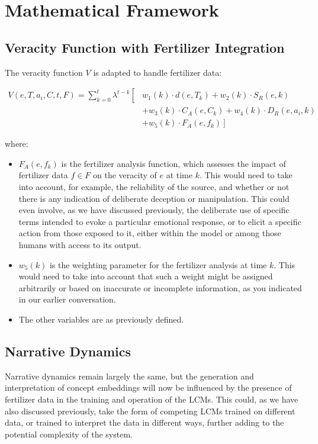 \documentclass[12pt, a4paper]{article}
\begin{document}
\section{Mathematical Framework}

\subsection{Veracity Function with Fertilizer Integration}
The veracity function $V$ is adapted to handle fertilizer data:

\begin{equation}
\begin{split}
V(e, T, a_i, C, t, F) = \sum_{k=0}^t \lambda^{t-k} \left[ \right. & w_1(k) \cdot d(e, T_k) + w_2(k) \cdot S_R(e,k)  \\
 & \left. + w_3(k) \cdot C_A(e, C_k) + w_4(k) \cdot D_R(e, a_i, k)  \right. \\
 & \left. + w_5(k) \cdot F_A(e, f_k) \right]
\end{split}
\end{equation}

where:
\begin{itemize}
    \item $F_A(e, f_k)$ is the fertilizer analysis function, which assesses the impact of fertilizer data $f \in F$ on the veracity of $e$ at time $k$. This would need to take into account, for example, the reliability of the source, and whether or not there is any indication of deliberate deception or manipulation. This could even involve, as we have discussed previously, the deliberate use of specific terms intended to evoke a particular emotional response, or to elicit a specific action from those exposed to it, either within the model or among those humans with access to its output.
    \item $w_5(k)$ is the weighting parameter for the fertilizer analysis at time $k$. This would need to take into account that such a weight might be assigned arbitrarily or based on inaccurate or incomplete information, as you indicated in our earlier conversation.
    \item The other variables are as previously defined.
\end{itemize}

\subsection{Narrative Dynamics}
Narrative dynamics remain largely the same, but the generation and interpretation of concept embeddings will now be influenced by the presence of fertilizer data in the training and operation of the LCMs. This could, as we have also discussed previously, take the form of competing LCMs trained on different data, or trained to interpret the data in different ways, further adding to the potential complexity of the system.
\end{document}
